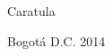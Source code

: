 \newpage
\vfill
\begin{center}
\begin{Huge}
Caratula
\end{Huge}

\vfill
Bogotá D.C. 2014

\end{center}
\vfill